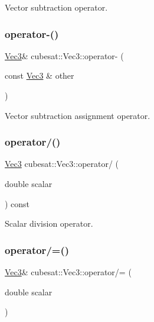 Vector subtraction operator. 

\mbox{\label{structcubesat_1_1Vec3_ac50053dd4f3112bd1e9028dd10d67305}} 
\subsubsection{\texorpdfstring{operator-\/()}{operator-()}\hspace{0.1cm}{\footnotesize\ttfamily [2/2]}}
{\footnotesize\ttfamily \hyperlink{structcubesat_1_1Vec3}{Vec3}\& cubesat\+::\+Vec3\+::operator-\/ (\begin{DoxyParamCaption}\item[{const \hyperlink{structcubesat_1_1Vec3}{Vec3} \&}]{other }\end{DoxyParamCaption})\hspace{0.3cm}{\ttfamily [inline]}}



Vector subtraction assignment operator. 

\mbox{\label{structcubesat_1_1Vec3_a5fe9b0fabe439775202c015e34b0557b}} 
\subsubsection{\texorpdfstring{operator/()}{operator/()}}
{\footnotesize\ttfamily \hyperlink{structcubesat_1_1Vec3}{Vec3} cubesat\+::\+Vec3\+::operator/ (\begin{DoxyParamCaption}\item[{double}]{scalar }\end{DoxyParamCaption}) const\hspace{0.3cm}{\ttfamily [inline]}}



Scalar division operator. 

\mbox{\label{structcubesat_1_1Vec3_a7c915443fdc168992881c3f9efe848a9}} 
\subsubsection{\texorpdfstring{operator/=()}{operator/=()}}
{\footnotesize\ttfamily \hyperlink{structcubesat_1_1Vec3}{Vec3}\& cubesat\+::\+Vec3\+::operator/= (\begin{DoxyParamCaption}\item[{double}]{scalar }\end{DoxyParamCaption})\hspace{0.3cm}{\ttfamily [inline]}}



